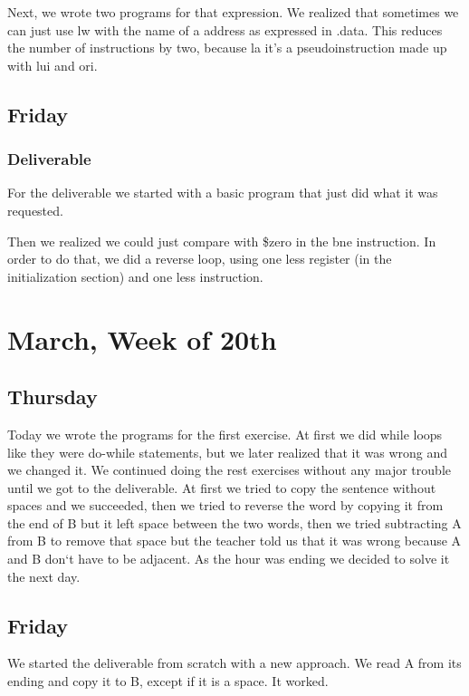 \documentclass{report}
\begin{document}
Next, we wrote two programs for that expression. We realized that sometimes we can just use lw with the name of a address as expressed in .data. This reduces the number of instructions by two, because la it's a pseudoinstruction made up with lui and ori.

\section{Friday}

\subsection{Deliverable}

For the deliverable we started with a basic program that just did what it was requested.



Then we realized we could just compare with \$zero in the bne instruction. In order to do that, we did a reverse loop, using one less register (in the initialization section) and one less instruction.



\chapter{March, Week of 20th}

\section{Thursday}
Today we wrote the programs for the first exercise. At first we did while loops like they were do-while statements, but we later realized that it was wrong and we changed it.
We continued doing the rest exercises without any major trouble until we got to the deliverable.
At first we tried to copy the sentence without spaces and we succeeded, then we tried to reverse the word by copying it from the end of B but it left space between the two words, then we tried subtracting A from B to remove that space but the teacher told us that it was wrong because A and B don`t have to be adjacent. As the hour was ending we decided to solve it the next day.
\section{Friday}
We started the deliverable from scratch with a new approach. We read A from its ending and copy it to B, except if it is a space. It worked.
\end{document}
